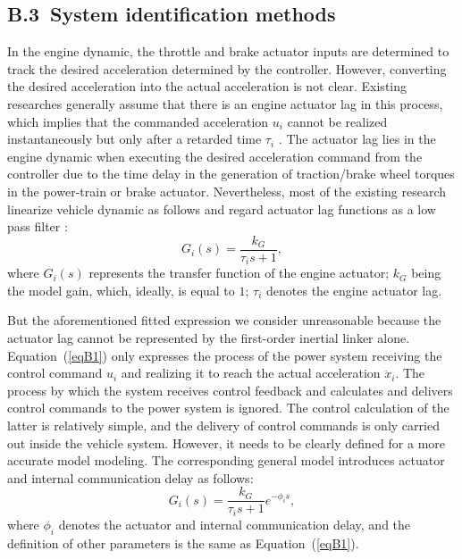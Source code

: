 \documentclass[journal]{IEEEtran}
\begin{document}
\subsection*{B.3~System identification methods}
\label{Section B.3}

In the engine dynamic, the throttle and brake actuator inputs are determined to track the desired acceleration determined by the controller.
However, converting the desired acceleration into the actual acceleration is not clear. Existing researches generally assume that there is an engine actuator lag in this process, which implies that the commanded acceleration $u_i$ cannot be realized instantaneously but only after a retarded time $\tau_i$ \citep{Mak2011}. The actuator lag lies in the engine dynamic when executing the desired acceleration command from the controller due to the time delay in the generation of traction/brake wheel torques in the power-train or brake actuator. Nevertheless, most of the existing research linearize vehicle dynamic as follows and regard actuator lag functions as a low pass filter \citep{Wang2018e,Naus2010a}:
\begin{equation}
  G_i(s)=\frac{k_G}{\tau_is+1},
  \label{eqB1}
\end{equation}
where $G_i(s)$ represents the transfer function of the engine actuator; $k_G$ being the model gain, which, ideally, is equal to $1$; $\tau_i$ denotes the engine actuator lag.

But the aforementioned fitted expression we consider unreasonable because the actuator lag cannot be represented by the first-order inertial linker alone. Equation~(\ref{eqB1}) only expresses the process of the power system receiving the control command $u_i$ and realizing it to reach the actual acceleration ${\ddot{x}}_i$. The process by which the system receives control feedback and calculates and delivers control commands to the power system is ignored. The control calculation of the latter is relatively simple, and the delivery of control commands is only carried out inside the vehicle system. However, it needs to be clearly defined for a more accurate model modeling. The corresponding general model introduces actuator and internal communication delay as follows:
\begin{equation}
  G_i(s)=\frac{k_G}{\tau_is+1}e^{-\phi_is},
  \label{eqB2}
\end{equation}
where $\phi_i$ denotes the actuator and internal communication delay, and the definition of other parameters is the same as Equation~(\ref{eqB1}).
\end{document}

